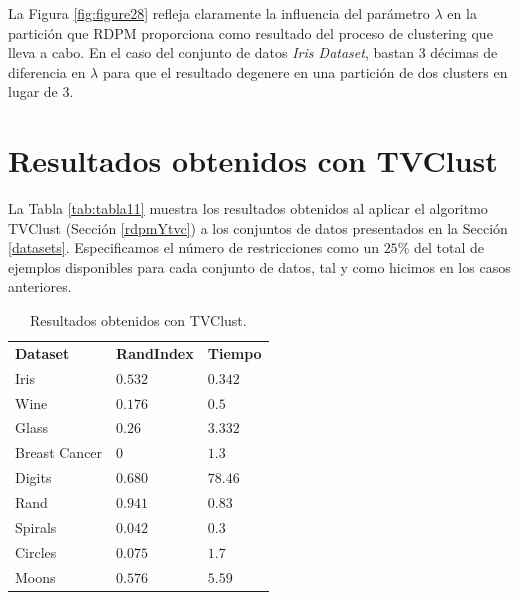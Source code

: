 La Figura \ref{fig:figure28} refleja claramente la influencia del parámetro $\lambda$ en la partición que \acs{RDPM} proporciona como resultado del proceso de clustering que lleva a cabo. En el caso del conjunto de datos \textit{Iris Dataset}, bastan 3 décimas de diferencia en $\lambda$ para que el resultado degenere en una partición de dos clusters en lugar de 3.

\clearpage

\section{Resultados obtenidos con TVClust}

La Tabla \ref{tab:tabla11} muestra los resultados obtenidos al aplicar el algoritmo \acf{TVClust} (Sección \ref{rdpmYtvc}) a los conjuntos de datos presentados en la Sección \ref{datasets}. Especificamos el número de restricciones como un $25\%$ del total de ejemplos disponibles para cada conjunto de datos, tal y como hicimos en los casos anteriores.

\begin{table}[!h]
	\centering
	\setlength{\arrayrulewidth}{1mm}
	\setlength{\tabcolsep}{10pt}
	\renewcommand{\arraystretch}{0.9}
	
	\begin{tabular}{ >{\centering\arraybackslash}m{2.5cm}  >{\centering\arraybackslash}m{1.8cm}>{\centering\arraybackslash}m{1.5cm}}
		\hline
		\rowcolor{black}
		\multicolumn{3}{c}{\bf \color{white}{Resultados obtenidos con TVClust}}\\
		\hline
		\rowcolor{gray!50}
		\textbf{Dataset} & \textbf{RandIndex} & \textbf{Tiempo}  \\
		Iris & $0.532$ & $0.342$  \\
		Wine & $0.176$ & $0.5$  \\
		Glass & $0.26$ & $3.332$  \\
		Breast Cancer & $0$ & $1.3$  \\
		Digits & $0.680$ & $78.46$  \\
		Rand & $0.941$ & $0.83$  \\
		Spirals & $0.042$ & $0.3$  \\
		Circles & $0.075$ & $1.7$  \\
		Moons & $0.576$ & $5.59$  \\
		\hline
		
	\end{tabular}
	\caption{Resultados obtenidos con \acs{TVClust}.}
	\label{tab:tabla12}
\end{table}


